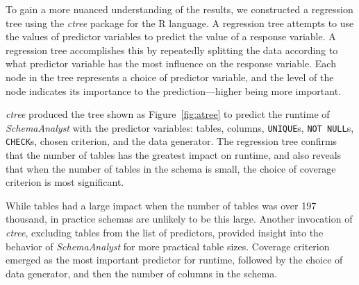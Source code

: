 
To gain a more nuanced understanding of the results, we constructed a regression tree using the \textit{ctree} package
for the R language. A regression tree attempts to use the values of predictor variables to predict the value of a
response variable. A regression tree accomplishes this by repeatedly splitting the data according to what predictor
variable has the most influence on the response variable. Each node in the tree represents a choice of predictor
variable, and the level of the node indicates its importance to the prediction---higher being more important.

\textit{ctree} produced the tree shown as Figure~\ref{fig:atree} to predict the runtime of \textit{SchemaAnalyst} with
the predictor variables: tables, columns, {\tt UNIQUE}s, {\tt NOT NULL}s, {\tt CHECK}s, chosen criterion, and the data
generator.  The regression tree confirms that the number of tables has the greatest impact on runtime, and also reveals
that when the number of tables in the schema is small, the choice of coverage criterion is most significant.

While tables had a large impact when the number of tables was over 197 thousand, in practice schemas are unlikely to be
this large. Another invocation of \textit{ctree}, excluding tables from the list of predictors, provided insight into
the behavior of \textit{SchemaAnalyst} for more practical table sizes. Coverage criterion emerged as the most important
predictor for runtime, followed by the choice of data generator, and then the number of columns in the schema.
